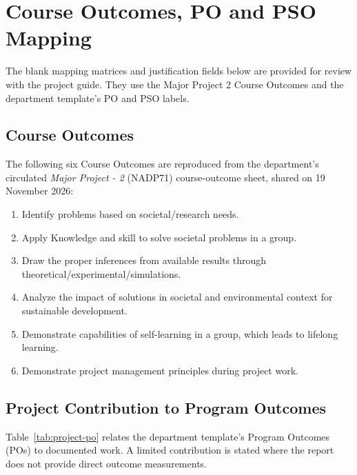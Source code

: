 \section{Course Outcomes, PO and PSO Mapping}

The blank mapping matrices and justification fields below are provided
for review with the project guide. They use the Major Project 2 Course
Outcomes and the department template's PO and PSO labels.

\subsection{Course Outcomes}

The following six Course Outcomes are reproduced from the department's
circulated \emph{Major Project - 2} (NADP71) course-outcome sheet,
shared on 19 November 2026:

\begin{enumerate}[label=\textbf{CO\arabic*:}, leftmargin=2.2cm]
\raggedright
    \item Identify problems based on societal/research needs.
    \item Apply Knowledge and skill to solve societal problems in a group.
    \item Draw the proper inferences from available results through
    \mbox{theoretical/experimental/simulations}.
    \item Analyze the impact of solutions in societal and environmental
    context for sustainable development.
    \item Demonstrate capabilities of self-learning in a group, which
    leads to lifelong learning.
    \item Demonstrate project management principles during project work.
\end{enumerate}

\subsection{Project Contribution to Program Outcomes}

Table~\ref{tab:project-po} relates the department template's Program
Outcomes (POs) to documented work. A limited contribution is stated
where the report does not provide direct outcome measurements.

